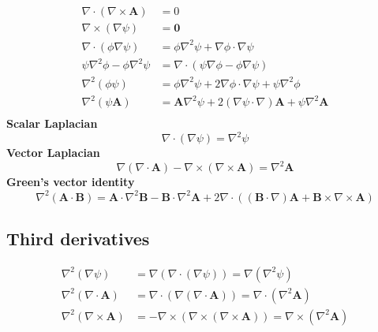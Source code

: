 \documentclass[11pt]{article}
\begin{document}
\begin{multicols}{2}
\begin{align*}
 \nabla\cdot(\nabla\times\mathbf{A})&=0 \\
 \nabla\times(\nabla\psi)&= \mathbf{0} \\
 \nabla\cdot(\phi\nabla\psi)&=\phi\nabla^{2}\psi + \nabla\phi\cdot\nabla\psi \\
 \psi\nabla^2\phi-\phi\nabla^2\psi&= \nabla\cdot\left(\psi\nabla\phi-\phi\nabla\psi\right)\\
 \nabla^2(\phi\psi)&=\phi\nabla^2\psi+2\nabla\phi\cdot\nabla\psi+\psi\nabla^2\phi\\
 \nabla^2(\psi\mathbf{A})&=\mathbf{A}\nabla^2\psi+2(\nabla\psi\cdot\nabla)\mathbf{A}+\psi\nabla^2\mathbf{A}\\
\end{align*}
\textbf{Scalar Laplacian}
\[\nabla\cdot(\nabla\psi)=\nabla^{2}\psi \] %
\textbf{Vector Laplacian}
\[\nabla\left(\nabla\cdot\mathbf{A}\right)-\nabla\times\left(\nabla\times\mathbf{A}\right)=\nabla^{2}\mathbf{A} \] %
\textbf{Green's vector identity}
\[\nabla^2(\mathbf{A}\cdot\mathbf{B})= \mathbf{A}\cdot\nabla^2\mathbf{B} - \mathbf{B}\cdot\nabla^2\mathbf{A} + 2\nabla\cdot((\mathbf{B}\cdot\nabla)\mathbf{A} + \mathbf{B}\times\nabla\times\mathbf{A}) \]%

\subsection*{Third derivatives}
\begin{align*}
\nabla^{2}(\nabla\psi) &= \nabla(\nabla\cdot(\nabla\psi)) = \nabla(\nabla^{2}\psi)\\
 \nabla^{2}(\nabla\cdot\mathbf{A}) &= \nabla\cdot(\nabla(\nabla\cdot\mathbf{A})) =\nabla\cdot(\nabla^{2}\mathbf{A})\\
 \nabla^{2}(\nabla\times\mathbf{A}) &= -\nabla\times(\nabla\times(\nabla\times\mathbf{A})) = \nabla\times(\nabla^{2}\mathbf{A})
\end{align*}
\end{multicols}

\newpage
\end{document}
